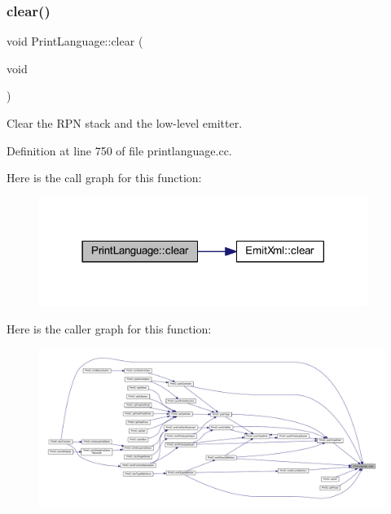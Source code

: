 \mbox{\label{class_print_language_abfe1a661666d149f042b3240740da5f1}} 
\subsubsection{\texorpdfstring{clear()}{clear()}}
{\footnotesize\ttfamily void Print\+Language\+::clear (\begin{DoxyParamCaption}\item[{void}]{ }\end{DoxyParamCaption})\hspace{0.3cm}{\ttfamily [virtual]}}



Clear the R\+PN stack and the low-\/level emitter. 



Definition at line 750 of file printlanguage.\+cc.

Here is the call graph for this function\+:
\nopagebreak
\begin{figure}[H]
\begin{center}
\leavevmode
\includegraphics[width=302pt]{class_print_language_abfe1a661666d149f042b3240740da5f1_cgraph}
\end{center}
\end{figure}
Here is the caller graph for this function\+:
\nopagebreak
\begin{figure}[H]
\begin{center}
\leavevmode
\includegraphics[width=350pt]{class_print_language_abfe1a661666d149f042b3240740da5f1_icgraph}
\end{center}
\end{figure}
\mbox{\label{class_print_language_a3fbbabf7a0a2f67e02b49d895db04fa9}} 
